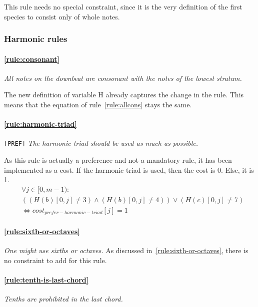     This rule needs no special constraint, since it is the very definition of the first species  to consist only of whole notes.

\subsubsection{Harmonic rules}
\paragraph{\hspace{.6cm}\ref{rule:consonant}} \greendots \textit{All notes on the downbeat are consonant with the notes of the lowest stratum.}
    
    The new definition of variable H already captures the change in the rule. This means that the equation of rule~\ref{rule:allcons} stays the same.
    \paragraph{\hspace{.6cm}\ref{rule:harmonic-triad}} \texttt{[PREF]} \textit{The harmonic triad should be used as much as possible.}
    
    As this rule is actually a preference and not a mandatory rule, it has been implemented as a cost. If the harmonic triad is used, then the cost is 0. Else, it is 1.
    \begin{equation}
    \begin{aligned}
    &\forall j \in [0, m-1) \colon \\
    &((H(b)[0, j] \neq 3) \land (H(b)[0, j] \neq 4)) \lor (H(c)[0, j]  \neq 7) \\
    &\iff cost_{prefer-harmonic-triad}[j] = 1
    \end{aligned}
    \end{equation}

    \paragraph{\hspace{.6cm}\ref{rule:sixth-or-octaves}}  \textit{One might use sixths or octaves.}
    As discussed in~\ref{rule:sixth-or-octaves}, there is no constraint to add for this rule.
    
    \paragraph{\hspace{.6cm}\ref{rule:tenth-is-last-chord}}  \textit{Tenths are prohibited in the last chord.}

